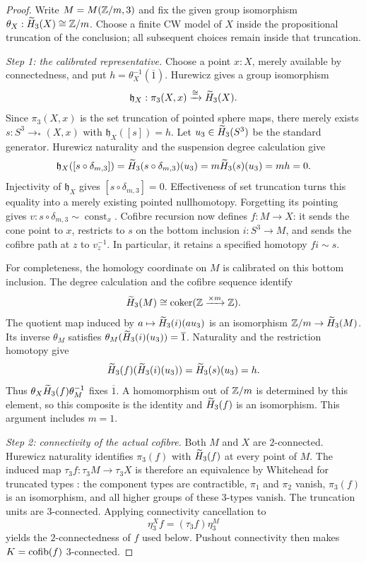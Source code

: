 \begin{proof}
Write $M=M(\mathbb Z/m,3)$ and fix the given group isomorphism $\theta_X:\widetilde H_3(X)\cong\mathbb Z/m$. Choose a finite CW model of $X$ inside the propositional truncation of the conclusion; all subsequent choices remain inside that truncation.

\emph{Step 1: the calibrated representative.}
Choose a point $x:X$, merely available by connectedness, and put $h=\theta_X^{-1}(\overline1)$. Hurewicz gives a group isomorphism
\[
\mathfrak h_X:\pi_3(X,x)\xrightarrow{\cong}\widetilde H_3(X).
\]
Since $\pi_3(X,x)$ is the set truncation of pointed sphere maps, there merely exists $s:S^3\to_*(X,x)$ with $\mathfrak h_X([s])=h$. Let $u_3\in\widetilde H_3(S^3)$ be the standard generator. Hurewicz naturality and the suspension degree calculation give
\[
\mathfrak h_X([s\circ\delta_{m,3}])
=\widetilde H_3(s\circ\delta_{m,3})(u_3)
=m\widetilde H_3(s)(u_3)=mh=0.
\]
Injectivity of $\mathfrak h_X$ gives $[s\circ\delta_{m,3}]=0$. Effectiveness of set truncation turns this equality into a merely existing pointed nullhomotopy. Forgetting its pointing gives $v:s\circ\delta_{m,3}\sim\operatorname{const}_x$. Cofibre recursion now defines $f:M\to X$: it sends the cone point to $x$, restricts to $s$ on the bottom inclusion $i:S^3\to M$, and sends the cofibre path at $z$ to $v_z^{-1}$. In particular, it retains a specified homotopy $f i\sim s$.

For completeness, the homology coordinate on $M$ is calibrated on this bottom inclusion. The degree calculation and the cofibre sequence identify
\[
\widetilde H_3(M)\cong\operatorname{coker}(\mathbb Z\xrightarrow{\times m}\mathbb Z).
\]
The quotient map induced by $a\mapsto\widetilde H_3(i)(a u_3)$ is an isomorphism $\mathbb Z/m\to\widetilde H_3(M)$. Its inverse $\theta_M$ satisfies $\theta_M(\widetilde H_3(i)(u_3))=\overline1$. Naturality and the restriction homotopy give
\[
\widetilde H_3(f)(\widetilde H_3(i)(u_3))=\widetilde H_3(s)(u_3)=h.
\]
Thus $\theta_X\widetilde H_3(f)\theta_M^{-1}$ fixes $\overline1$. A homomorphism out of $\mathbb Z/m$ is determined by this element, so this composite is the identity and $\widetilde H_3(f)$ is an isomorphism. This argument includes $m=1$.

\emph{Step 2: connectivity of the actual cofibre.}
Both $M$ and $X$ are $2$-connected. Hurewicz naturality identifies $\pi_3(f)$ with $\widetilde H_3(f)$ at every point of $M$. The induced map $\tau_3f:\tau_3M\to\tau_3X$ is therefore an equivalence by Whitehead for truncated types \cite[\S8.8]{hott}: the component types are contractible, $\pi_1$ and $\pi_2$ vanish, $\pi_3(f)$ is an isomorphism, and all higher groups of these $3$-types vanish. The truncation units are $3$-connected. Applying connectivity cancellation to
\[
\eta_3^X f=(\tau_3 f)\eta_3^M
\]
yields the $2$-connectedness of $f$ used below. Pushout connectivity then makes $K=\operatorname{cofib}(f)$ $3$-connected.


\end{proof}
